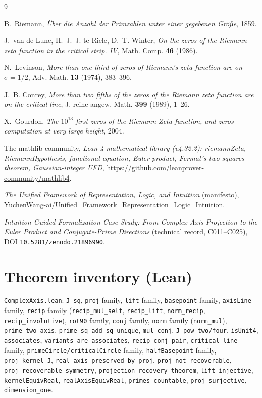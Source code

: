 \documentclass[11pt]{article}
\theoremstyle{remark}
\begin{document}
\begin{thebibliography}{9}

B.~Riemann,
\emph{Über die Anzahl der Primzahlen unter einer gegebenen Größe},
1859.

J.~van de Lune, H.~J.~J. te Riele, D.~T. Winter,
\emph{On the zeros of the Riemann zeta function in the critical strip. IV},
Math. Comp. \textbf{46} (1986).

N.~Levinson,
\emph{More than one third of zeros of Riemann's zeta-function are on
$\sigma=1/2$},
Adv. Math. \textbf{13} (1974), 383--396.

J.~B. Conrey,
\emph{More than two fifths of the zeros of the Riemann zeta function are on
the critical line},
J. reine angew. Math. \textbf{399} (1989), 1--26.

X.~Gourdon,
\emph{The $10^{13}$ first zeros of the Riemann Zeta function, and zeros
computation at very large height},
2004.

The mathlib community,
\emph{Lean 4 mathematical library (v4.32.2): riemannZeta, RiemannHypothesis,
functional equation, Euler product, Fermat's two-squares theorem,
Gaussian-integer UFD},
\url{https://github.com/leanprover-community/mathlib4}.

\emph{The Unified Framework of Representation, Logic, and Intuition}
(manifesto),
YuchenWang-ai/Unified\_Framework\_Representation\_Logic\_Intuition.

\emph{Intuition-Guided Formalization Case Study: From Complex-Axis Projection
to the Euler Product and Conjugate-Prime Directions} (technical record,
C011--C025), DOI \texttt{10.5281/zenodo.21896990}.

\end{thebibliography}

\appendix
\section{Theorem inventory (Lean)}

\texttt{ComplexAxis.lean}: \texttt{J\_sq}, \texttt{proj} family,
\texttt{lift} family, \texttt{basepoint} family, \texttt{axisLine} family,
\texttt{recip} family (\texttt{recip\_mul\_self}, \texttt{recip\_lift},
\texttt{norm\_recip}, \texttt{recip\_involutive}), \texttt{rot90} family,
\texttt{conj} family, \texttt{norm} family (\texttt{norm\_mul}),
\texttt{prime\_two\_axis}, \texttt{prime\_sq\_add\_sq\_unique},
\texttt{mul\_conj}, \texttt{J\_pow\_two/four}, \texttt{isUnit4},
\texttt{associates}, \texttt{variants\_are\_associates},
\texttt{recip\_conj\_pair}, \texttt{critical\_line} family,
\texttt{primeCircle/criticalCircle} family, \texttt{halfBasepoint} family,
\texttt{proj\_kernel\_J}, \texttt{real\_axis\_preserved\_by\_proj},
\texttt{proj\_not\_recoverable}, \texttt{proj\_recoverable\_symmetry},
\texttt{projection\_recovery\_theorem}, \texttt{lift\_injective},
\texttt{kernelEquivReal}, \texttt{realAxisEquivReal},
\texttt{primes\_countable}, \texttt{proj\_surjective},
\texttt{dimension\_one}.
\end{document}
